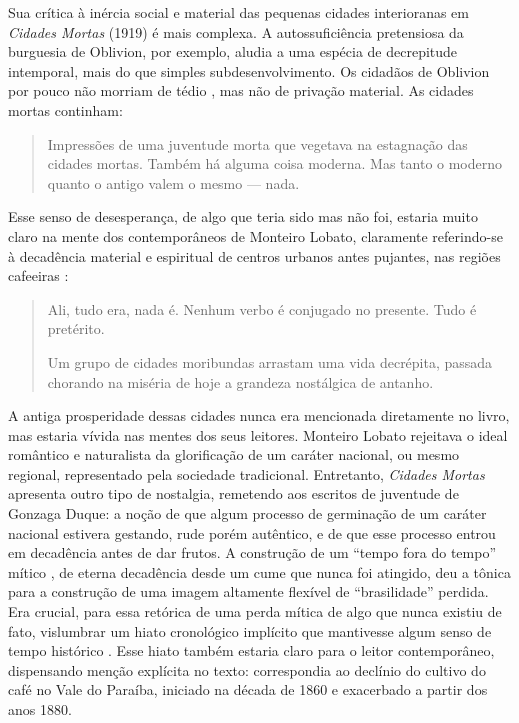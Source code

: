 Sua crítica à inércia social e material das pequenas cidades
interioranas em \emph{Cidades Mortas} (1919) é mais complexa. A
autossuficiência pretensiosa da burguesia de Oblivion, por exemplo,
aludia a uma espécia de decrepitude intemporal, mais do que simples
subdesenvolvimento. Os cidadãos de Oblivion por pouco não morriam de
tédio \autocite[p.~25]{monteirolobato:1919cidades}, mas não de privação
material. As cidades mortas continham:

\begin{quote}
Impressões de uma juventude morta que vegetava na estagnação das cidades
mortas. Também há alguma coisa moderna. Mas tanto o moderno quanto o
antigo valem o mesmo --- nada.
\autocite[epígrafe]{monteirolobato:1919cidades}
\end{quote}

Esse senso de desesperança, de algo que teria sido mas não foi, estaria
muito claro na mente dos contemporâneos de Monteiro Lobato, claramente
referindo-se à decadência material e espiritual de centros urbanos antes
pujantes, nas regiões cafeeiras
\autocite[p.~299]{silva:2013modernidade}:

\begin{quote}
Ali, tudo era, nada é. Nenhum verbo é conjugado no presente. Tudo é
pretérito.

Um grupo de cidades moribundas arrastam uma vida decrépita, passada
chorando na miséria de hoje a grandeza nostálgica de antanho.
\autocite[p.~8]{monteirolobato:1919cidades}
\end{quote}

A antiga prosperidade dessas cidades nunca era mencionada diretamente no
livro, mas estaria vívida nas mentes dos seus leitores. Monteiro Lobato
rejeitava o ideal romântico e naturalista da glorificação de um caráter
nacional, ou mesmo regional, representado pela sociedade tradicional.
Entretanto, \emph{Cidades Mortas} apresenta outro tipo de nostalgia,
remetendo aos escritos de juventude de Gonzaga Duque: a noção de que
algum processo de germinação de um caráter nacional estivera gestando,
rude porém autêntico, e de que esse processo entrou em decadência antes
de dar frutos. A construção de um ``tempo fora do tempo'' mítico
\autocite{eliade:1966aspects}, de eterna decadência desde um cume que
nunca foi atingido, deu a tônica para a construção de uma imagem
altamente flexível de ``brasilidade'' perdida. Era crucial, para essa
retórica de uma perda mítica de algo que nunca existiu de fato,
vislumbrar um hiato cronológico implícito que mantivesse algum senso de
tempo histórico \autocite[p.~293]{silva:2012cidades}. Esse hiato também
estaria claro para o leitor contemporâneo, dispensando menção explícita
no texto: correspondia ao declínio do cultivo do café no Vale do
Paraíba, iniciado na década de 1860 e exacerbado a partir dos anos 1880.

